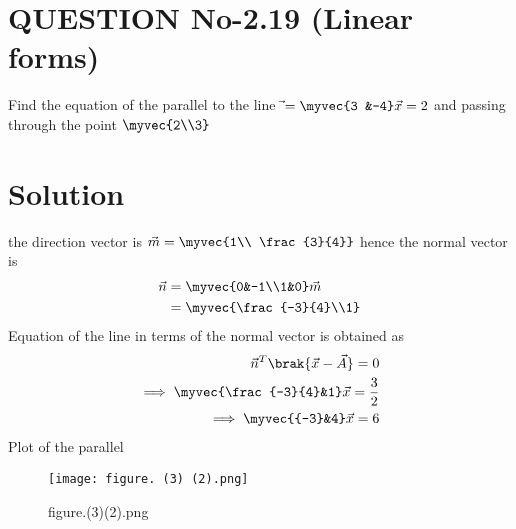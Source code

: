 \documentclass[journal,12pt,twocolumn]{IEEEtran}
\begin{document}
\section{QUESTION No-2.19 (Linear forms)}
Find the equation of the parallel to the line  $\vec{} = \myvec{3 &-4}\vec{x}=2$  
and passing through the point $\myvec{2\\3}$
%
\section*{Solution}
the direction vector is $\vec{m} = \myvec{1\\ \frac{3}{4}}$ 
hence the normal vector is
 \begin{align}
   \vec{n} &= \myvec{0&-1\\1&0}\vec{m}\\
   &=\myvec{\frac{-3}{4}\\1}
 \end{align}
Equation of the line in terms of the normal vector is obtained as
\begin{align}
\vec{n}^T\brak{\vec{x}-\vec{A}} = 0\\
\implies \myvec{\frac{-3}{4}&1}\vec{x}=\frac{3}{2}\\
\implies \myvec{{-3}&4}\vec{x}=6
\end{align}
Plot of the parallel
\begin{figure}[ht]
\centering
\texttt{[image: figure. (3) (2).png]}
\caption{figure.(3)(2).png}
\label{Plot of the parallel}
\end{figure}
\end{document}

